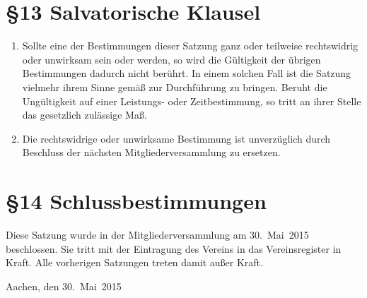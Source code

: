 \documentclass[11pt,ngerman]{article}
\begin{document}
\section*{§13 Salvatorische Klausel}
\begin{enumerate}
  \item Sollte eine der Bestimmungen dieser Satzung ganz oder teilweise rechtswidrig oder unwirksam sein oder werden, so wird die Gültigkeit der übrigen Bestimmungen dadurch nicht berührt. In einem solchen Fall ist die Satzung vielmehr ihrem Sinne gemäß zur Durchführung zu bringen. Beruht die Ungültigkeit auf einer Leistungs- oder Zeitbestimmung, so tritt an ihrer Stelle das gesetzlich zulässige Maß.

  \item Die rechtswidrige oder unwirksame Bestimmung ist unverzüglich durch Beschluss der nächsten Mitgliederversammlung zu ersetzen.
\end{enumerate}

\section*{§14 Schlussbestimmungen}
Diese Satzung wurde in der Mitgliederversammlung am 30.~Mai~2015 beschlossen. Sie tritt mit der Eintragung des Vereins in das Vereinsregister in Kraft. Alle vorherigen Satzungen treten damit außer Kraft.

Aachen, den 30.~Mai~2015
\end{document}
